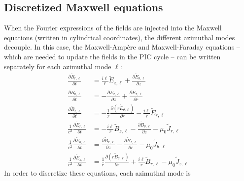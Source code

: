 \documentclass[]{report}
\begin{document}
\subsection{Discretized Maxwell equations} When the Fourier expressions
of the fields are injected into the Maxwell equations (written in
cylindrical coordinates), the different azimuthal modes
decouple. In this case, the Maxwell-Amp\`ere and Maxwell-Faraday equations
-- which are needed to update the fields in the PIC cycle -- can be written separately
for each azimuthal mode $\ell$:
\begin{subequations}
\begin{align}
\frac{\partial \tilde{B}_{r,\ell} }{\partial t} &=
\frac{i\ell}{r}\tilde{E}_{z,\ell} + \frac{\partial
  \tilde{E}_{\theta,\ell}}{\partial z} \\[3mm]
\frac{\partial \tilde{B}_{\theta,\ell} }{\partial t} &=
 - \frac{\partial \tilde{E}_{r,\ell}}{\partial z} + \frac{\partial
  \tilde{E}_{z,\ell}}{\partial r} \\[3mm]
\frac{\partial \tilde{B}_{z,\ell} }{\partial t} &=
- \frac{1}{r} \frac{\partial (r\tilde{E}_{\theta,\ell})}{\partial r} - \frac{i\ell}{r}\tilde{E}_{r,\ell} \\[3mm]
\frac{1}{c^2} \frac{\partial \tilde{E}_{r,\ell} }{\partial t} &=
-\frac{i\ell}{r}\tilde{B}_{z,\ell} - \frac{\partial
  \tilde{B}_{\theta,\ell}}{\partial z} - \mu_0 \tilde{J}_{r,\ell} \\[3mm]
\frac{1}{c^2}\frac{\partial \tilde{E}_{\theta,\ell} }{\partial t} &=
 \frac{\partial \tilde{B}_{r,\ell}}{\partial z} - \frac{\partial
  \tilde{B}_{z,\ell}}{\partial r} - \mu_0 \tilde{J}_{\theta,\ell} \\[3mm]
\frac{1}{c^2}\frac{\partial \tilde{E}_{z,\ell} }{\partial t} &=
 \frac{1}{r} \frac{\partial (r\tilde{B}_{\theta,\ell})}{\partial r} +
 \frac{i\ell}{r}\tilde{B}_{r,\ell} - \mu_0 \tilde{J}_{z,\ell}
\end{align}
\end{subequations}
%
In order to discretize these equations, each azimuthal mode is
\end{document}
